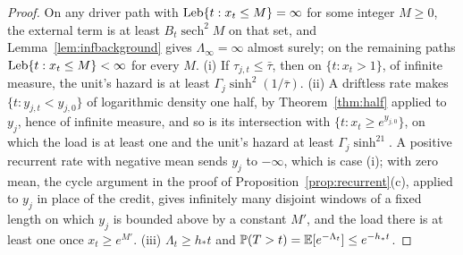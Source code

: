 \begin{proof}
On any driver path with $\operatorname{Leb}\{t:x_t\le M\}=\infty$ for some integer
$M\ge0$, the external term is at least $B_t\operatorname{sech}^2M$ on
that set, and Lemma~\ref{lem:infbackground} gives $\Lambda_\infty=\infty$
almost surely; on the remaining paths $\operatorname{Leb}\{t:x_t\le M\}<\infty$ for
every $M$. (i) If $\tau_{j,t}\le\bar\tau$, then on $\{t:x_t>1\}$, of
infinite measure, the unit's hazard is at least
$\Gamma_j\sinh^2(1/\bar\tau)$. (ii) A driftless rate makes
$\{t:y_{j,t}<y_{j,0}\}$ of logarithmic density one half, by
Theorem~\ref{thm:half} applied to $y_j$, hence of infinite measure, and so
is its intersection with $\{t:x_t\ge e^{y_{j,0}}\}$, on which the load is
at least one and the unit's hazard at least $\Gamma_j\sinh^21$. A
positive recurrent rate with negative mean sends $y_j$ to $-\infty$, which
is case (i); with zero mean, the cycle argument in the proof of
Proposition~\ref{prop:recurrent}(c), applied to $y_j$ in place of the
credit, gives infinitely many disjoint windows of a fixed length on which
$y_j$ is bounded above by a constant $M'$, and the load there is at least
one once $x_t\ge e^{M'}$. (iii) $\Lambda_t\ge h_\ast t$ and
$\mathbb{P}(T>t)=\mathbb{E}[e^{-\Lambda_t}]\le e^{-h_\ast t}$.
\end{proof}

